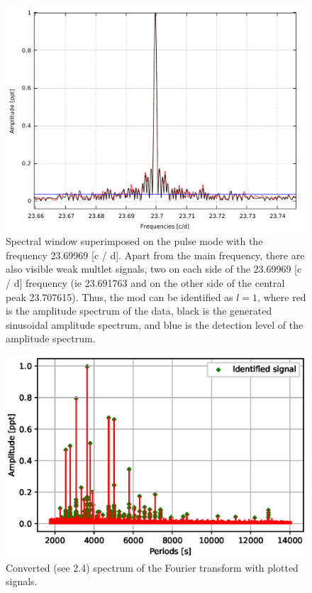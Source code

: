 \documentclass{aa}
\begin{document}
\begin{figure}[h]
    \centering
    \includegraphics[scale=0.58]{images/okno_poprawione_l1_to_l2.pdf}
    \caption{Spectral window superimposed on the pulse mode with the frequency 23.69969 [c / d]. Apart from the main frequency, there are also visible weak multlet signals, two on each side of the 23.69969 [c / d] frequency (ie 23.691763 and on the other side of the central peak 23.707615). Thus, the mod can be identified as $ l = 1 $, where red is the amplitude spectrum of the data, black is the generated sinusoidal amplitude spectrum, and blue is the detection level of the amplitude spectrum.}
    \label{fig:my_label_2_o}
\end{figure}

\begin{figure}[h]
    \centering
    \includegraphics[scale=1]{images/identified_signal_in_period.eps}
    \caption{Converted (see 2.4) spectrum of the Fourier transform with plotted signals.}
    \label{fig:my_label_3}
\end{figure}
\end{document}
